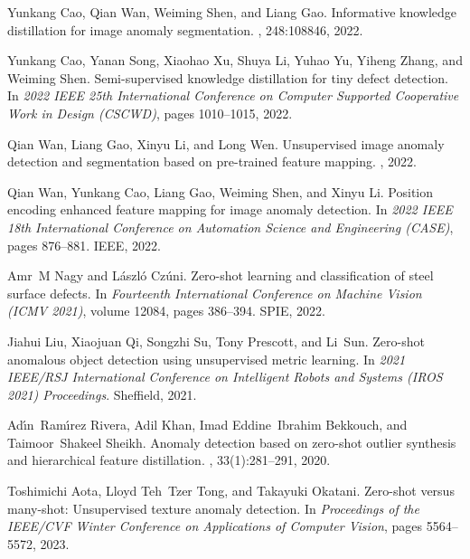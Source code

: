 {\begin{thebibliography}{10}
Yunkang Cao, Qian Wan, Weiming Shen, and Liang Gao.
\newblock Informative knowledge distillation for image anomaly segmentation.
, 248:108846, 2022.

Yunkang Cao, Yanan Song, Xiaohao Xu, Shuya Li, Yuhao Yu, Yiheng Zhang, and
  Weiming Shen.
\newblock Semi-supervised knowledge distillation for tiny defect detection.
\newblock In {\em 2022 IEEE 25th International Conference on Computer Supported
  Cooperative Work in Design (CSCWD)}, pages 1010--1015, 2022.

Qian Wan, Liang Gao, Xinyu Li, and Long Wen.
\newblock Unsupervised image anomaly detection and segmentation based on
  pre-trained feature mapping.
, 2022.

Qian Wan, Yunkang Cao, Liang Gao, Weiming Shen, and Xinyu Li.
\newblock Position encoding enhanced feature mapping for image anomaly
  detection.
\newblock In {\em 2022 {IEEE} 18th International Conference on Automation
  Science and Engineering ({CASE})}, pages 876--881. {IEEE}, 2022.

Amr~M Nagy and L{\'a}szl{\'o} Cz{\'u}ni.
\newblock Zero-shot learning and classification of steel surface defects.
\newblock In {\em Fourteenth International Conference on Machine Vision (ICMV
  2021)}, volume 12084, pages 386--394. SPIE, 2022.

Jiahui Liu, Xiaojuan Qi, Songzhi Su, Tony Prescott, and Li~Sun.
\newblock Zero-shot anomalous object detection using unsupervised metric
  learning.
\newblock In {\em 2021 IEEE/RSJ International Conference on Intelligent Robots
  and Systems (IROS 2021) Proceedings}. Sheffield, 2021.

Ad{\'\i}n~Ram{\'\i}rez Rivera, Adil Khan, Imad Eddine~Ibrahim Bekkouch, and
  Taimoor~Shakeel Sheikh.
\newblock Anomaly detection based on zero-shot outlier synthesis and
  hierarchical feature distillation.
,
  33(1):281--291, 2020.

Toshimichi Aota, Lloyd Teh~Tzer Tong, and Takayuki Okatani.
\newblock Zero-shot versus many-shot: Unsupervised texture anomaly detection.
\newblock In {\em Proceedings of the IEEE/CVF Winter Conference on Applications
  of Computer Vision}, pages 5564--5572, 2023.


\end{thebibliography}}
